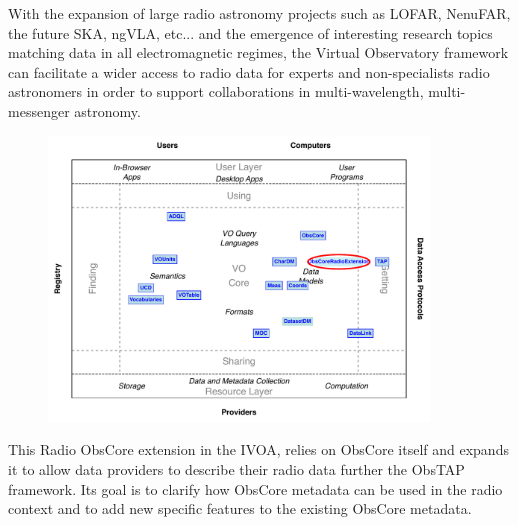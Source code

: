 \documentclass[11pt,a4paper]{ivoa}
\begin{document}
With the expansion of large radio astronomy projects such as LOFAR, NenuFAR, the future SKA, ngVLA, etc...
and the emergence of interesting research topics matching data in all electromagnetic regimes, the 
Virtual Observatory framework can facilitate a wider access to radio data for experts and 
non-specialists radio astronomers in order to support collaborations in multi-wavelength, 
multi-messenger astronomy. 



\begin{figure}[H]
\centering

\includegraphics[width=0.9\textwidth]{role_diagram.pdf}
\label{fig:architecture}
\end{figure}


This Radio ObsCore extension in the IVOA, relies  on ObsCore itself and expands it
to allow data providers to describe their radio data further the  ObsTAP framework.
Its goal is to clarify how  ObsCore metadata  can be used in the  radio context and to add new specific features to the existing ObsCore metadata.
\end{document}
